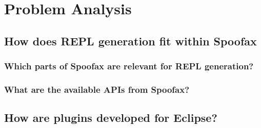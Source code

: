 \section{Problem Analysis}
\label{sec:problem-analysis}

\subsection{How does REPL generation fit within Spoofax}
\label{ssec:architecture}

\subsubsection{Which parts of Spoofax are relevant for REPL
  generation?}
\label{sec:which-parts-spoofax}

\subsubsection{What are the available APIs from Spoofax?}
\label{sec:what-are-available}

\subsection{How are plugins developed for Eclipse?}
\label{ssec:eclipse-plugins}

